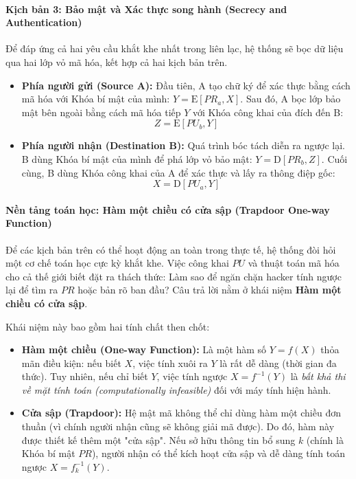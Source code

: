 \paragraph*{Kịch bản 3: Bảo mật và Xác thực song hành (Secrecy and Authentication)}
Để đáp ứng cả hai yêu cầu khắt khe nhất trong liên lạc, hệ thống sẽ bọc dữ liệu qua hai lớp vỏ mã hóa, kết hợp cả hai kịch bản trên.
\begin{itemize}
    \item \textbf{Phía người gửi (Source A):} Đầu tiên, A tạo chữ ký để xác thực bằng cách mã hóa với Khóa bí mật của mình: $Y = \mathrm{E}[PR_a, X]$. Sau đó, A bọc lớp bảo mật bên ngoài bằng cách mã hóa tiếp $Y$ với Khóa công khai của đích đến B:
    $$Z = \mathrm{E}[PU_b, Y]$$
    \item \textbf{Phía người nhận (Destination B):} Quá trình bóc tách diễn ra ngược lại. B dùng Khóa bí mật của mình để phá lớp vỏ bảo mật: $Y = \mathrm{D}[PR_b, Z]$. Cuối cùng, B dùng Khóa công khai của A để xác thực và lấy ra thông điệp gốc: 
    $$X = \mathrm{D}[PU_a, Y]$$
\end{itemize}

\paragraph*{Nền tảng toán học: Hàm một chiều có cửa sập (Trapdoor One-way Function)}
Để các kịch bản trên có thể hoạt động an toàn trong thực tế, hệ thống đòi hỏi một cơ chế toán học cực kỳ khắt khe. Việc công khai $PU$ và thuật toán mã hóa cho cả thế giới biết đặt ra thách thức: Làm sao để ngăn chặn hacker tính ngược lại để tìm ra $PR$ hoặc bản rõ ban đầu? Câu trả lời nằm ở khái niệm \textbf{Hàm một chiều có cửa sập}.

Khái niệm này bao gồm hai tính chất then chốt:
\begin{itemize}
    \item \textbf{Hàm một chiều (One-way Function):} Là một hàm số $Y = f(X)$ thỏa mãn điều kiện: nếu biết $X$, việc tính xuôi ra $Y$ là rất dễ dàng (thời gian đa thức). Tuy nhiên, nếu chỉ biết $Y$, việc tính ngược $X = f^{-1}(Y)$ là \textit{bất khả thi về mặt tính toán (computationally infeasible)} đối với máy tính hiện hành.
    \item \textbf{Cửa sập (Trapdoor):} Hệ mật mã không thể chỉ dùng hàm một chiều đơn thuần (vì chính người nhận cũng sẽ không giải mã được). Do đó, hàm này được thiết kế thêm một "cửa sập". Nếu sở hữu thông tin bổ sung $k$ (chính là Khóa bí mật $PR$), người nhận có thể kích hoạt cửa sập và dễ dàng tính toán ngược $X = f_k^{-1}(Y)$.
\end{itemize}

